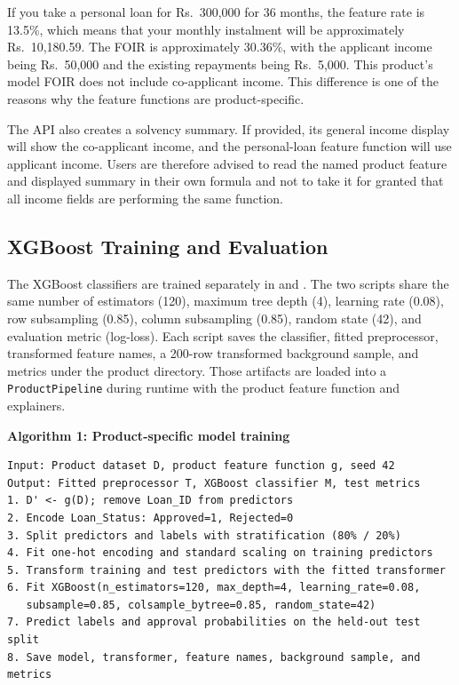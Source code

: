If you take a personal loan for Rs.~300,000 for 36 months, the feature rate is 13.5\%, which means that your monthly instalment will be approximately Rs.~10,180.59. The FOIR is approximately 30.36\%, with the applicant income being Rs.~50,000 and the existing repayments being Rs.~5,000. This product's model FOIR does not include co-applicant income. This difference is one of the reasons why the feature functions are product-specific.

The API also creates a solvency summary. If provided, its general income display will show the co-applicant income, and the personal-loan feature function will use applicant income. Users are therefore advised to read the named product feature and displayed summary in their own formula and not to take it for granted that all income fields are performing the same function.

\subsection{XGBoost Training and Evaluation}
The XGBoost classifiers are trained separately in  and . The two scripts share the same number of estimators (120), maximum tree depth (4), learning rate (0.08), row subsampling (0.85), column subsampling (0.85), random state (42), and evaluation metric (log-loss). Each script saves the classifier, fitted preprocessor, transformed feature names, a 200-row transformed background sample, and metrics under the product directory. Those artifacts are loaded into a \texttt{ProductPipeline} during runtime with the product feature function and explainers.

\noindent\begin{minipage}{\textwidth}
\textbf{Algorithm 1: Product-specific model training}\par\smallskip
\begin{lstlisting}
Input: Product dataset D, product feature function g, seed 42
Output: Fitted preprocessor T, XGBoost classifier M, test metrics
1. D' <- g(D); remove Loan_ID from predictors
2. Encode Loan_Status: Approved=1, Rejected=0
3. Split predictors and labels with stratification (80% / 20%)
4. Fit one-hot encoding and standard scaling on training predictors
5. Transform training and test predictors with the fitted transformer
6. Fit XGBoost(n_estimators=120, max_depth=4, learning_rate=0.08,
   subsample=0.85, colsample_bytree=0.85, random_state=42)
7. Predict labels and approval probabilities on the held-out test split
8. Save model, transformer, feature names, background sample, and metrics
\end{lstlisting}
\end{minipage}\par\medskip

